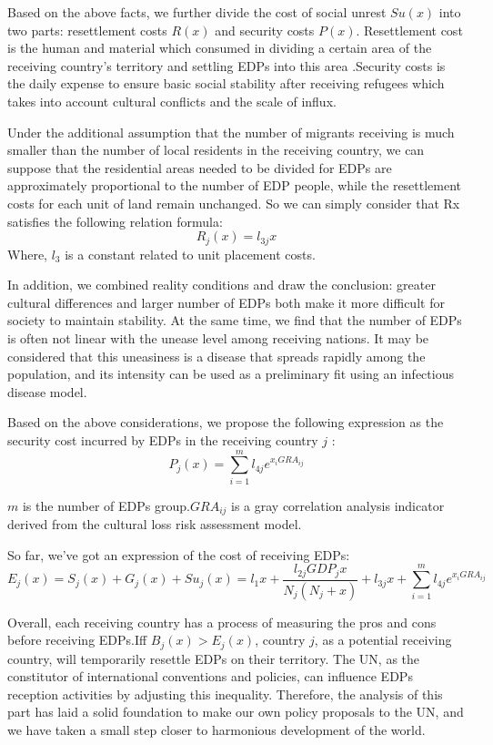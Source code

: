 \documentclass{mcmthesis}
\begin{document}
Based on the above facts, we further divide the cost of social unrest $ Su(x) $ into two parts: resettlement costs $ R(x) $ and security costs $ P(x) $.  Resettlement cost is the human and material which consumed in dividing a certain area of the receiving country's territory and settling EDPs into this area .Security costs is the daily expense to ensure basic social stability after receiving refugees which takes into account cultural conflicts and the scale of influx. 

Under the additional assumption that the number of migrants receiving is much smaller than the number of local residents in the receiving country, we can suppose that the residential areas needed to be divided for EDPs are approximately proportional to the number of EDP people, while the resettlement costs for each unit of land remain unchanged. So we can simply consider that Rx satisfies the following relation formula: 
\begin{equation}
R_{j}(x)=l_{3j}x
\end{equation}
Where, $ l_{3} $ is a constant related to unit placement costs. 

In addition, we combined reality conditions and draw the conclusion: greater cultural differences and larger number of EDPs both make it more difficult for society to maintain stability. At the same time, we find that the number of EDPs is often not linear with the unease level among receiving nations. It may be considered that this uneasiness is a disease that spreads rapidly among the population, and its intensity can be used as a preliminary fit using an infectious disease model. 

Based on the above considerations, we propose the following expression as the security cost incurred by EDPs in the receiving country $j$ :
\begin{equation}
P_{j}(x)=\sum_{i=1}^{m}l_{4j}e^{x_{i}GRA_{ij}}
\end{equation}

$ m $ is the number of EDPs group.$ {GRA}_{ij}$ is a gray correlation analysis indicator derived from the cultural loss risk assessment model.

So far, we've got an expression of the cost of receiving EDPs:
\begin{equation}
E_{j}(x)=S_{j}(x)+G_{j}(x)+Su_{j}(x)=l_{1}x+\dfrac{l_{2j}GDP_{j}x}{N_{j}(N_{j}+x)}+l_{3j}x+\sum_{i=1}^{m}l_{4j}e^{x_{i}GRA_{ij}}
\end{equation}

Overall, each receiving country has a process of measuring the pros and cons before receiving EDPs.Iff $ B_{j}(x)>E_{j}(x) $, country $ j $, as a potential receiving country, will temporarily resettle EDPs on their territory. The UN, as the constitutor of international conventions and policies, can influence EDPs reception activities by adjusting this inequality. Therefore, the analysis of this part has laid a solid foundation to make our own policy proposals to the UN, and we have taken a small step closer to harmonious development of the world. 
\end{document}
